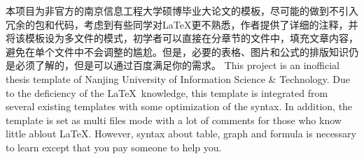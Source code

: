 \abstract
{
本项目为非官方的南京信息工程大学硕博毕业大论文的模板，尽可能的做到不引入冗余的包和代码，考虑到有些同学对\LaTeX 更不熟悉，作者提供了详细的注释，并将该模板设为多文件的模式，初学者可以直接在分章节的文件中，填充文章内容，避免在单个文件中不会调整的尴尬。但是，必要的表格、图片和公式的排版知识仍是必须了解的，但是可以通过百度满足你的需求。
}
{
This project is an inofficial thesis template of Nanjing University of Information Science \& Technology. Due to the deficiency of the \LaTeX~knowledge, this template is integrated from several existing templates with some optimization of the  syntax. In addition, the template is set as multi files mode with a lot of comments for those who know little ablout \LaTeX. However, syntax about table, graph and formula is necessary to learn except that you pay someone to help you.
}
